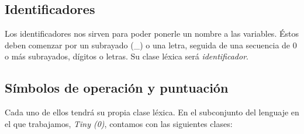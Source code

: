 \subsection{Identificadores}

Los identificadores nos sirven para poder ponerle un nombre a las variables. Éstos deben comenzar por un subrayado (\_) o una letra, seguida de una secuencia de 0 o más
subrayados, dígitos o letras. Su clase léxica será \textit{identificador}.

\subsection{Símbolos de operación y puntuación}

Cada uno de ellos tendrá su propia clase léxica. En el subconjunto del lenguaje en el que trabajamos, \textit{Tiny (0)}, contamos con
las siguientes clases:

